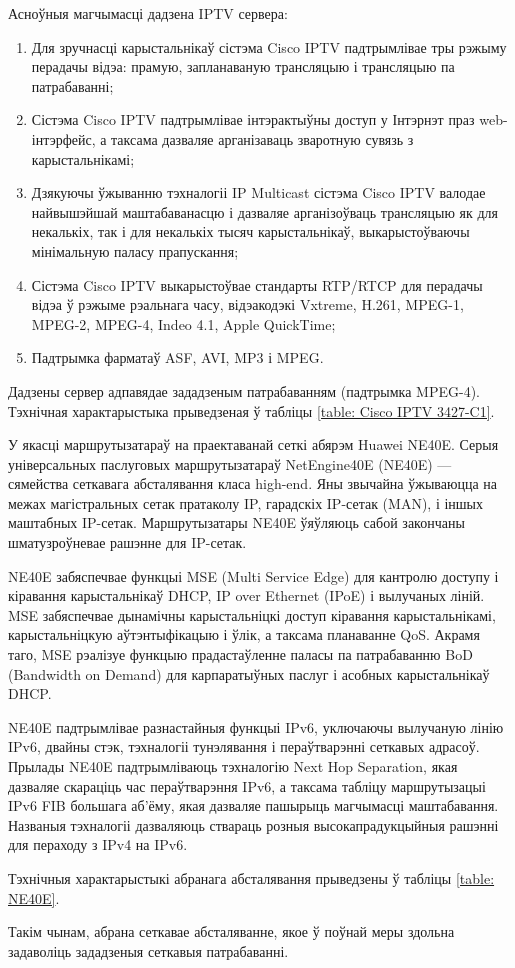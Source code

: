 Асноўныя магчымасці дадзена IPTV сервера:
\begin{enumerate}
    \item Для зручнасці карыстальнікаў сістэма Cisco IPTV падтрымлівае тры рэжыму перадачы відэа: прамую, запланаваную трансляцыю і трансляцыю па патрабаванні;
    \item Сістэма Cisco IPTV падтрымлівае інтэрактыўны доступ у Інтэрнэт праз web-інтэрфейс, а таксама дазваляе арганізаваць зваротную сувязь з карыстальнікамі;
    \item Дзякуючы ўжыванню тэхналогіі IP Multicast сістэма Cisco IPTV валодае найвышэйшай маштабаванасцю і дазваляе арганізоўваць трансляцыю як для некалькіх, так і для некалькіх тысяч карыстальнікаў, выкарыстоўваючы мінімальную паласу прапускання;
    \item Сістэма Cisco IPTV выкарыстоўвае стандарты RTP/RTCP для перадачы відэа ў рэжыме рэальнага часу, відэакодэкі Vxtreme, H.261, MPEG-1, MPEG-2, MPEG-4, Indeo 4.1, Apple QuickTime;
    \item Падтрымка фарматаў ASF, AVI, MP3 і MPEG.
\end{enumerate}

Дадзены сервер адпавядае зададзеным патрабаванням (падтрымка MPEG-4).
Тэхнічная характарыстыка прыведзеная ў табліцы
\ref{table: Cisco IPTV 3427-C1}.

У якасці маршрутызатараў на праектаванай сеткі абярэм Huawei NE40E. Серыя універсальных паслуговых маршрутызатараў NetEngine40E (NE40E) --- сямейства сеткавага абсталявання класа high-end. Яны звычайна ўжываюцца на межах магістральных сетак пратаколу IP, гарадскіх IP-сетак (MAN), і іншых маштабных IP-сетак. Маршрутызатары NE40E ўяўляюць сабой закончаны шматузроўневае рашэнне для IP-сетак.

NE40E забяспечвае функцыі MSE (Multi Service Edge) для кантролю доступу і кіравання карыстальнікаў DHCP, IP over Ethernet (IPoE) і вылучаных ліній. MSE забяспечвае дынамічны карыстальніцкі доступ кіравання карыстальнікамі,
карыстальніцкую аўтэнтыфікацыю і ўлік, а таксама планаванне QoS. Акрамя таго, MSE рэалізуе функцыю прадастаўленне паласы па патрабаванню BoD (Bandwidth on Demand) для карпаратыўных паслуг і асобных карыстальнікаў DHCP.

NE40E падтрымлівае разнастайныя функцыі IPv6, уключаючы вылучаную лінію IPv6, двайны стэк, тэхналогіі тунэлявання і пераўтварэнні сеткавых адрасоў. Прылады NE40E падтрымліваюць тэхналогію Next Hop Separation, якая дазваляе скараціць час пераўтварэння IPv6, а таксама табліцу маршрутызацыі IPv6 FIB большага аб'ёму, якая дазваляе пашырыць магчымасці маштабавання. Названыя тэхналогіі дазваляюць ствараць розныя высокапрадукцыйныя рашэнні для пераходу з IPv4 на IPv6.

Тэхнічныя характарыстыкі абранага абсталявання прыведзены ў
табліцы \ref{table: NE40E}.

Такім чынам, абрана сеткавае абсталяванне, якое ў поўнай меры здольна задаволіць зададзеныя сеткавыя патрабаванні.
